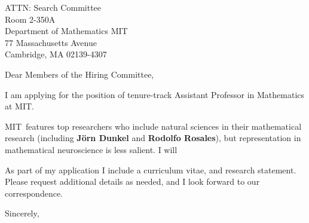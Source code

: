 \documentclass[11pt,a4paper]{letter}
\begin{document}

\def\School{MIT}

\begin{letter}
{ATTN: Search Committee\\
Room 2-350A\\
Department of Mathematics MIT\\
77 Massachusetts Avenue\\
Cambridge, MA 02139-4307}


\opening{Dear Members of the Hiring Committee,}

I am applying for the position of tenure-track Assistant Professor in Mathematics at \School. 



\School~features top researchers who include natural sciences in their mathematical research (including \textbf{Jörn Dunkel} and \textbf{Rodolfo Rosales}), but representation in mathematical neuroscience is less salient. I will 



As part of my application I include a curriculum vitae, and research statement. Please request additional details as needed, and I look forward to our correspondence.

\closing{Sincerely,}
\end{letter}
\end{document}
